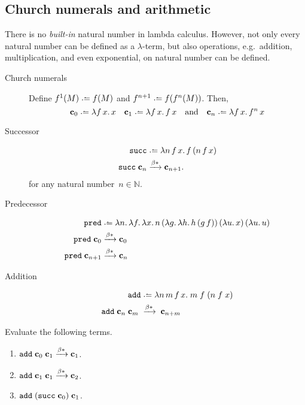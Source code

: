 \subsection{Church numerals and arithmetic}
There is no \emph{built-in} natural number in lambda calculus. However, 
not only every natural number can be defined as a $\lambda$-term, but also 
operations, e.g.\ addition, multiplication, and even exponential, on natural
number can be defined. 

\begin{description}
  \item[Church numerals]
  Define $f^1(M) \defeq f(M)$ and $f^{n+1} \defeq f (f^n(M))$. Then, 
  \[
    \bc_0 \defeq \lambda f\,x.\, x
    \quad
    \bc_{1} \defeq \lambda f\,x.\, f\,x
    \quad\text{and}\quad
    \bc_{n} \defeq \lambda f\,x.\, f^{n}\,x
  \] 
  \item[Successor]
    \begin{align*}
      \mathtt{succ} &\defeq \lambda n\,f\,x.\, f\,(n\,f\,x) \\
      \mathtt{succ}\;\bc_n &\reduce \bc_{n+1}.
    \end{align*}
    for any natural number~$n \in \mathbb{N}$.
  \item[Predecessor]
    \begin{align*}
      \mathtt{pred} & \defeq \lambda n.\,\lambda f.\,\lambda x.\,n\,(\lambda
      g.\,\lambda h.\,h\,(g\,f))\,
      (\lambda u.\,x)\,(\lambda u.\,u) \\
      \mathtt{pred}\;\bc_{0}   & \reduce \bc_{0} \\
      \mathtt{pred}  \;\bc_{n+1} & \reduce \bc_{n}
    \end{align*}
  \item[Addition]
    \begin{align*}
      \mathtt{add} & \defeq \lambda n\,m\,f\,x.\; m\;f\;(n\;f\;x)  \\
      \mathtt{add}\;\bc_{n}\;\bc_{m}\;
      & \reduce\;\bc_{n + m}
    \end{align*}
\end{description}

\begin{example}
  Evaluate the following terms.
  \begin{enumerate}
    \item $\mathtt{add}\;\mathbf{c}_{0}\;\mathbf{c}_{1}
      \xrightarrow{\beta*} \mathbf{c}_{1}$.
    \item $\mathtt{add}\;\mathbf{c}_{1}\;\mathbf{c}_{1}
      \xrightarrow{\beta*} \mathbf{c}_{2}$.
    \item $\mathtt{add}\;(\mathtt{succ}\;\mathbf{c}_{0})\;\mathbf{c}_{1}$.
    \end{enumerate}
\end{example}

